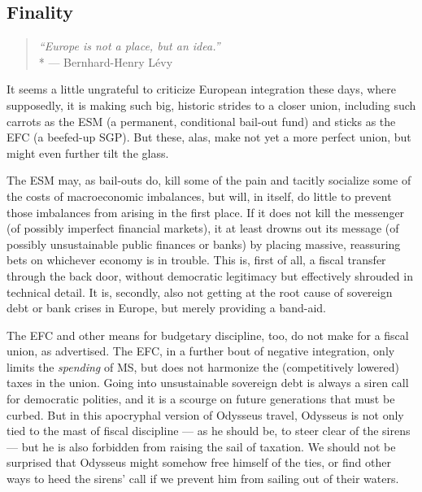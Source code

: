 \subsection[Finality]{Finality}

\begin{quote}
	\emph{``Europe is not a place, but an idea.''}
	\\*
	--- Bernhard-Henry L\'{e}vy
\end{quote}

It seems a little ungrateful to criticize European integration these days, where supposedly, it is making such big, historic strides to a closer union, including such carrots as the \gls{ESM} (a permanent, conditional bail-out fund) and sticks as the \gls{EFC} (a beefed-up \gls{SGP}).
But these, alas, make not yet a more perfect union, but might even further tilt the glass.

The \gls{ESM} may, as bail-outs do, kill some of the pain and tacitly socialize some of the costs of macroeconomic imbalances, but will, in itself, do little to prevent those imbalances from arising in the first place.
If it does not kill the messenger (of possibly imperfect financial markets), it at least drowns out its message (of possibly unsustainable public finances or banks) by placing massive, reassuring bets on whichever economy is in trouble.
This is, first of all, a fiscal transfer through the back door, without democratic legitimacy but effectively  shrouded in technical detail.
It is, secondly, also not getting at the root cause of sovereign debt or bank crises in Europe, but merely providing a band-aid.

The \gls{EFC} and other means for budgetary discipline, too, do not make for a fiscal union, as advertised.
The \gls{EFC}, in a further bout of negative integration, only limits the \emph{spending} of \gls{MS}, but does not harmonize the (competitively lowered) taxes in the union.
Going into unsustainable sovereign debt is always a siren call for democratic polities, and it is a scourge on future generations that must be curbed.
But in this apocryphal version of Odysseus travel, Odysseus is not only tied to the mast of fiscal discipline --- as he should be, to steer clear of the sirens --- but he is also forbidden from raising the sail of taxation.
We should not be surprised that Odysseus might somehow free himself of the ties, or find other ways to heed the sirens' call if we prevent him from sailing out of their waters.

